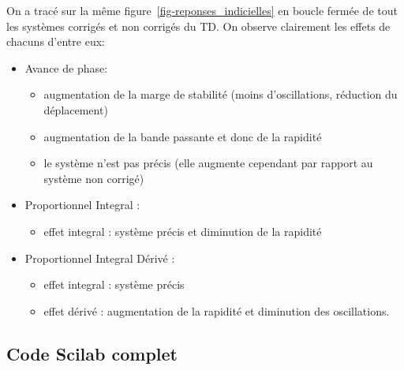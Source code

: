 On a tracé sur la même figure~\ref{fig-reponses_indicielles} en boucle fermée 
de tout les systèmes corrigés et non corrigés du TD. On observe clairement les
effets de chacuns d'entre eux:
\begin{itemize}
    \item Avance de phase: 
        \begin{itemize}
            \item augmentation de la marge de stabilité 
                  (moins d'oscillations, réduction du déplacement)
            \item augmentation de la bande passante et donc de la rapidité
            \item le système n'est pas précis (elle augmente cependant par 
                  rapport au système non corrigé)
        \end{itemize}
    \item Proportionnel Integral : 
        \begin{itemize}
            \item effet integral : système précis et diminution de la rapidité 
        \end{itemize} 
    \item Proportionnel Integral Dérivé :
        \begin{itemize}
            \item effet integral : système précis
            \item effet dérivé : augmentation de la rapidité et 
                  diminution des oscillations.
        \end{itemize} 
\end{itemize}
\clearpage
\subsection*{Code Scilab complet}
\inputminted{scilab}{scilab/code_exercice_chap_correction.sce}

